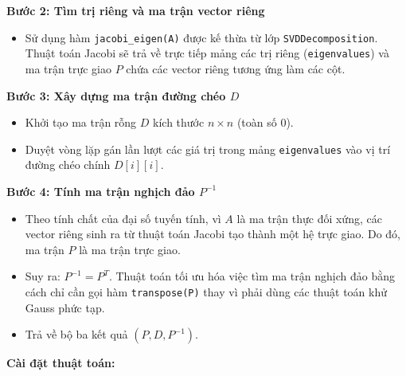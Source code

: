 \documentclass[a4paper]{article}
\begin{document}
\textbf{Bước 2: Tìm trị riêng và ma trận vector riêng}
\begin{itemize}
    \item Sử dụng hàm \texttt{jacobi\_eigen(A)} được kế thừa từ lớp \texttt{SVDDecomposition}. Thuật toán Jacobi sẽ trả về trực tiếp mảng các trị riêng (\texttt{eigenvalues}) và ma trận trực giao $P$ chứa các vector riêng tương ứng làm các cột.
\end{itemize}

\textbf{Bước 3: Xây dựng ma trận đường chéo $D$}
\begin{itemize}
    \item Khởi tạo ma trận rỗng $D$ kích thước $n \times n$ (toàn số 0).
    \item Duyệt vòng lặp gán lần lượt các giá trị trong mảng \texttt{eigenvalues} vào vị trí đường chéo chính $D[i][i]$.
\end{itemize}

\textbf{Bước 4: Tính ma trận nghịch đảo $P^{-1}$}
\begin{itemize}
    \item Theo tính chất của đại số tuyến tính, vì $A$ là ma trận thực đối xứng, các vector riêng sinh ra từ thuật toán Jacobi tạo thành một hệ trực giao. Do đó, ma trận $P$ là ma trận trực giao.
    \item Suy ra: $P^{-1} = P^T$. Thuật toán tối ưu hóa việc tìm ma trận nghịch đảo bằng cách chỉ cần gọi hàm \texttt{transpose(P)} thay vì phải dùng các thuật toán khử Gauss phức tạp.
    \item Trả về bộ ba kết quả $(P, D, P^{-1})$.
\end{itemize}

\textbf{Cài đặt thuật toán:}
\end{document}
